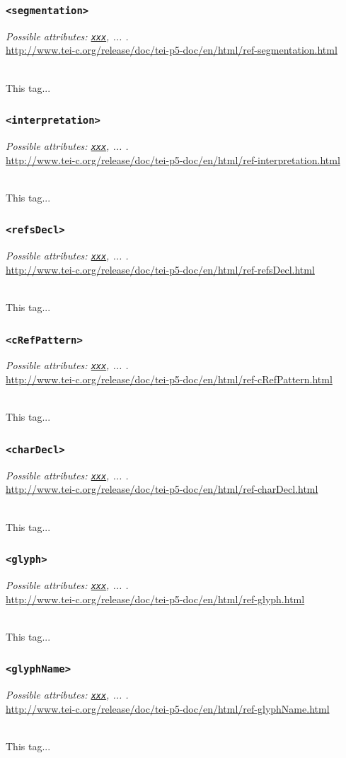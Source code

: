 \documentclass[12pt,a4paper]{article}
\newcommand{\taglinks}[2]{
\vspace*{-0.5ex}
\hspace*{\parindent}
\begin{minipage}{\textwidth}
  \emph{Possible attributes: #1.} \\ \url{#2} \end{minipage} \vspace{0.5ex} \\ }
\begin{document}
\subsubsection{\texttt{<segmentation>}} \label{tag-sec:segmentation}
\taglinks{
\hyperref[att-sec:xxx]{\texttt{xxx}}, ... }
{http://www.tei-c.org/release/doc/tei-p5-doc/en/html/ref-segmentation.html}
This tag...

\subsubsection{\texttt{<interpretation>}} \label{tag-sec:interpretation}
\taglinks{
\hyperref[att-sec:xxx]{\texttt{xxx}}, ... }
{http://www.tei-c.org/release/doc/tei-p5-doc/en/html/ref-interpretation.html}
This tag...

\subsubsection{\texttt{<refsDecl>}} \label{tag-sec:refsDecl}
\taglinks{
\hyperref[att-sec:xxx]{\texttt{xxx}}, ... }
{http://www.tei-c.org/release/doc/tei-p5-doc/en/html/ref-refsDecl.html}
This tag...

\subsubsection{\texttt{<cRefPattern>}} \label{tag-sec:cRefPattern}
\taglinks{
\hyperref[att-sec:xxx]{\texttt{xxx}}, ... }
{http://www.tei-c.org/release/doc/tei-p5-doc/en/html/ref-cRefPattern.html}
This tag...

\subsubsection{\texttt{<charDecl>}} \label{tag-sec:charDecl}
\taglinks{
\hyperref[att-sec:xxx]{\texttt{xxx}}, ... }
{http://www.tei-c.org/release/doc/tei-p5-doc/en/html/ref-charDecl.html}
This tag...

\subsubsection{\texttt{<glyph>}} \label{tag-sec:glyph}
\taglinks{
\hyperref[att-sec:xxx]{\texttt{xxx}}, ... }
{http://www.tei-c.org/release/doc/tei-p5-doc/en/html/ref-glyph.html}
This tag...

\subsubsection{\texttt{<glyphName>}} \label{tag-sec:glyphName}
\taglinks{
\hyperref[att-sec:xxx]{\texttt{xxx}}, ... }
{http://www.tei-c.org/release/doc/tei-p5-doc/en/html/ref-glyphName.html}
This tag...
\end{document}
